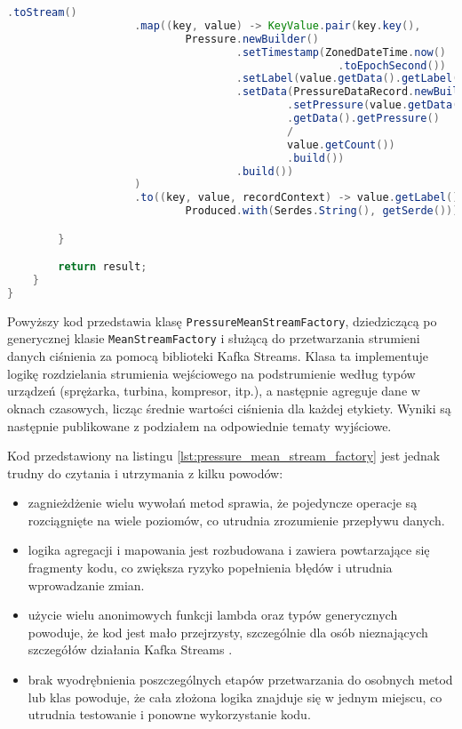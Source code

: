 \begin{lstlisting}[caption={Implementacja w klasie PressureMeanStreamFactory}, label={lst:pressure_mean_stream_factory},language=Java]
                    .toStream()
                    .map((key, value) -> KeyValue.pair(key.key(),
                            Pressure.newBuilder()
                                    .setTimestamp(ZonedDateTime.now()
                                                    .toEpochSecond())
                                    .setLabel(value.getData().getLabel())
                                    .setData(PressureDataRecord.newBuilder()
                                            .setPressure(value.getData()
                                            .getData().getPressure() 
                                            / 
                                            value.getCount())
                                            .build())
                                    .build())
                    )
                    .to((key, value, recordContext) -> value.getLabel().toString() + getOutputTopicsPostfix(),
                            Produced.with(Serdes.String(), getSerde()));

        }

        return result;
    }
}  

\end{lstlisting}

Powyższy kod przedstawia klasę \texttt{PressureMeanStreamFactory}, dziedziczącą po generycznej klasie \texttt{MeanStreamFactory} i służącą do przetwarzania strumieni danych ciśnienia za pomocą biblioteki Kafka Streams. Klasa ta implementuje logikę rozdzielania strumienia wejściowego na podstrumienie według typów urządzeń (sprężarka, turbina, kompresor, itp.), a następnie agreguje dane w oknach czasowych, licząc średnie wartości ciśnienia dla każdej etykiety. Wyniki są następnie publikowane z podziałem na odpowiednie tematy wyjściowe.

\vspace{0.3em}

Kod przedstawiony na listingu \ref{lst:pressure_mean_stream_factory} jest jednak trudny do czytania i utrzymania z kilku powodów:
\begin{itemize}
    \item zagnieżdżenie wielu wywołań metod sprawia, że pojedyncze operacje są rozciągnięte na wiele poziomów, co utrudnia zrozumienie przepływu danych.
    \item logika agregacji i mapowania jest rozbudowana i zawiera powtarzające się fragmenty kodu, co zwiększa ryzyko popełnienia błędów i utrudnia wprowadzanie zmian.
    \item użycie wielu anonimowych funkcji lambda oraz typów generycznych powoduje, że kod jest mało przejrzysty, szczególnie dla osób nieznających szczegółów działania Kafka Streams \cite{kafka_streams}.
    \item brak wyodrębnienia poszczególnych etapów przetwarzania do osobnych metod lub klas powoduje, że cała złożona logika znajduje się w jednym miejscu, co utrudnia testowanie i ponowne wykorzystanie kodu.
\end{itemize}

